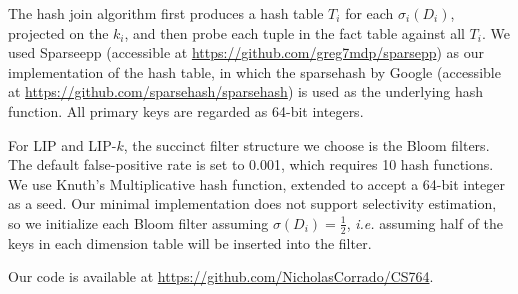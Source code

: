 The hash join algorithm first produces a hash table $T_i$ for each $\sigma_i(D_i)$, projected on the $k_i$, and then probe each tuple in the fact table against all $T_i$. We used Sparseepp (accessible at \url{https://github.com/greg7mdp/sparsepp}) as our implementation of the hash table, in which the sparsehash by Google (accessible at \url{https://github.com/sparsehash/sparsehash}) is used as the underlying hash function. All primary keys are regarded as 64-bit integers.

For LIP and LIP-$k$, the succinct filter structure we choose is the Bloom filters. 
The default false-positive rate is set to 0.001, which requires 10 hash functions.
We use Knuth's Multiplicative hash function, extended to accept a 64-bit integer as a seed. 
Our minimal implementation does not support selectivity estimation, 
so we initialize each Bloom filter assuming $\sigma(D_i) = \frac{1}{2}$, 
{\it i.e.} assuming half of the keys in each dimension table will be inserted into the filter.

Our code is available at \url{https://github.com/NicholasCorrado/CS764}.


